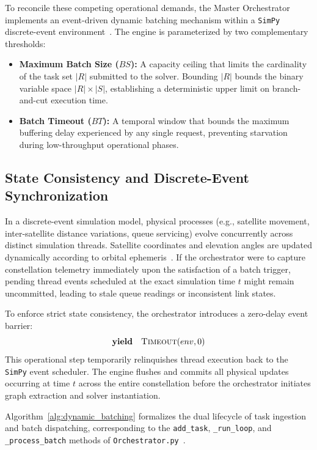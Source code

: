 To reconcile these competing operational demands, the Master Orchestrator implements an event-driven dynamic batching mechanism within a \texttt{SimPy} discrete-event environment~\cite{simpy2023}. 
The engine is parameterized by two complementary thresholds:
\begin{itemize}
    \item \textbf{Maximum Batch Size ($BS$):} A capacity ceiling that limits the cardinality of the task set $|R|$ submitted to the solver. Bounding $|R|$ bounds the binary variable space $|R| \times |S|$, establishing a deterministic upper limit on branch-and-cut execution time.
    \item \textbf{Batch Timeout ($BT$):} A temporal window that bounds the maximum buffering delay experienced by any single request, preventing starvation during low-throughput operational phases.
\end{itemize}

\subsection{State Consistency and Discrete-Event Synchronization}
\label{subsec:event_synchronization}

In a discrete-event simulation model, physical processes (e.g., satellite movement, inter-satellite distance variations, queue servicing) evolve concurrently across distinct simulation threads. 
Satellite coordinates and elevation angles are updated dynamically according to orbital ephemeris~\cite{vallado2006sgp4}. 
If the orchestrator were to capture constellation telemetry immediately upon the satisfaction of a batch trigger, pending thread events scheduled at the exact simulation time $t$ might remain uncommitted, leading to stale queue readings or inconsistent link states.

To enforce strict state consistency, the orchestrator introduces a zero-delay event barrier:
\begin{equation}
    \mathbf{yield} \quad \Call{Timeout}{env, 0}
\end{equation}
This operational step temporarily relinquishes thread execution back to the \texttt{SimPy} event scheduler. 
The engine flushes and commits all physical updates occurring at time $t$ across the entire constellation before the orchestrator initiates graph extraction and solver instantiation.

Algorithm~\ref{alg:dynamic_batching} formalizes the dual lifecycle of task ingestion and batch dispatching, corresponding to the \texttt{add\_task}, \texttt{\_run\_loop}, and \texttt{\_process\_batch} methods of \texttt{Orchestrator.py}~\cite{bagini_repo_2026}.

